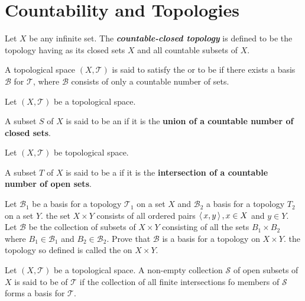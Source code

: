 \documentclass[10pt,a4paper]{report}
\newcommand{\BB}{\mathcal{B}}
\newcommand{\TT}{\mathcal{T}}
\newcommand{\SB}{\mathcal{S}}
\begin{document}
\section{Countability and Topologies}

\begin{definition} Let $X$ be any infinite set.  The \textbf{\textit{countable-closed topology}} is defined to be the topology having as its closed sets $X$ and all countable subsets of $X$.
\end{definition}

\begin{definition}A topological space $(X, \TT)$ is said to satisfy the  or to be  if there exists a basis $\BB$ for $\TT$, where $\BB$ consists of only a countable number of sets.
\end{definition}

\begin{definition}Let $(X, \TT)$ be a topological space.  \begin{center} A subset $S$ of $X$ is said to be an  if it is the \textbf{union of a countable number of closed sets}.\end{center}
\end{definition}

\begin{definition}Let $(X, \TT)$ be topological space.  \begin{center}A subset $T$ of $X$ is said to be a  if it is the \textbf{intersection of a countable number of open sets}.\end{center}
\end{definition}

\begin{definition}Let $\BB_1$ be a basis for a topology $\TT_1$ on a set $X$ and $\BB_2$ a basis for a topology $T_2$ on a set $Y$.  the set $X \times Y$ consists of all ordered pairs $\left \langle\, x,y \,\right \rangle, x \in X$ and $y \in Y$.  Let $\BB$ be the collection of subsets of $X \times Y$ consisting of all the sets $B_1 \times B_2$ where $B_1 \in \BB_1$ and $B_2 \in \BB_2$.  Prove that $\BB$ is a basis for a topology on $X \times Y$.  the topology so defined is called the  on $X \times Y$.
\end{definition}

\begin{definition}[Subbasis] Let $(X, \TT)$ be a topological space.  A non-empty collection $\SB$ of open subsets of $X$ is said to be  of $\TT$ if the collection of all finite intersections fo members of $\SB$ forms a basis for $\TT$.
\end{definition}
\end{document}
